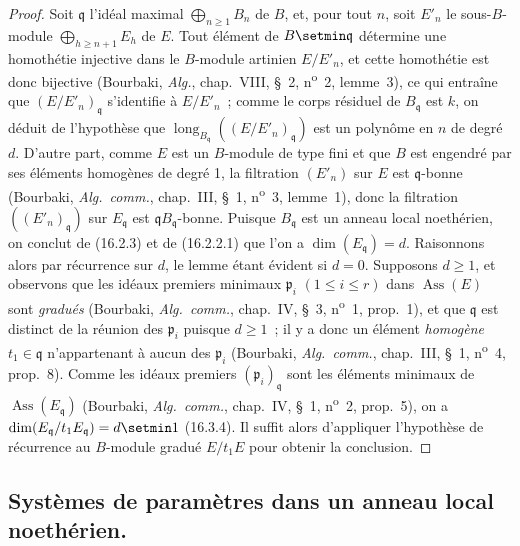 \begin{proof}
Soit $\mathfrak{q}$ l'idéal maximal $\bigoplus_{n\geq1}B_n$ de $B$, et, pour
tout $n$, soit $E'_n$ le sous-$B$-module $\bigoplus_{h\geq n+1}E_h$ de $E$.
Tout élément de $B\setmin\mathfrak{q}$ détermine une homothétie injective dans le
$B$-module artinien $E/E'_n$, et cette homothétie est donc bijective
(Bourbaki, \emph{Alg.}, chap.~VIII, \S~2, n\textsuperscript{o}~2, lemme~3), ce qui entraîne que
$(E/E'_n)_{\mathfrak{q}}$ s'identifie à $E/E'_n$~; comme le corps résiduel de
$B_{\mathfrak{q}}$ est $k$, on déduit de l'hypothèse que
$\operatorname{long}_{B_{\mathfrak{q}}}((E/E'_n)_{\mathfrak{q}})$ est un
polynôme en $n$ de degré $d$. D'autre part, comme $E$ est un $B$-module de
type fini et que $B$ est engendré par ses éléments homogènes de degré 1, la
filtration $(E'_n)$ sur $E$ est $\mathfrak{q}$-bonne (Bourbaki,
\emph{Alg.~comm.}, chap.~III, \S~1, n\textsuperscript{o}~3, lemme~1), donc la filtration
$((E'_n)_{\mathfrak{q}})$ sur $E_{\mathfrak{q}}$ est
$\mathfrak{q}B_{\mathfrak{q}}$-bonne. Puisque $B_{\mathfrak{q}}$ est un anneau
local noethérien, on conclut de (16.2.3) et de (16.2.2.1) que l'on a
$\dim(E_{\mathfrak{q}})=d$. Raisonnons alors par récurrence sur $d$, le lemme
étant évident si $d=0$. Supposons $d\geq1$, et observons que les idéaux premiers
minimaux $\mathfrak{p}_i$ $(1\leq i\leq r)$ dans
$\operatorname{Ass}(E)$ sont \emph{gradués} (Bourbaki, \emph{Alg.~comm.},
chap.~IV, \S~3, n\textsuperscript{o}~1, prop.~1), et que $\mathfrak{q}$ est distinct de la
réunion des $\mathfrak{p}_i$ puisque $d\geq1$~; il y a donc un élément
\emph{homogène} $t_1\in\mathfrak{q}$ n'appartenant à aucun des
$\mathfrak{p}_i$ (Bourbaki, \emph{Alg.~comm.}, chap.~III, \S~1, n\textsuperscript{o}~4,
prop.~8). Comme les idéaux premiers $(\mathfrak{p}_i)_{\mathfrak{q}}$ sont les
éléments minimaux de $\operatorname{Ass}(E_{\mathfrak{q}})$ (Bourbaki,
\emph{Alg.~comm.}, chap.~IV, \S~1, n\textsuperscript{o}~2, prop.~5), on a
$\dim(E_{\mathfrak{q}}/t_1E_{\mathfrak{q}})=d\setmin 1$ (16.3.4). Il suffit alors
d'appliquer l'hypothèse de récurrence au $B$-module gradué $E/t_1E$ pour
obtenir la conclusion.
\end{proof}

\subsection{Systèmes de paramètres dans un anneau local noethérien.}
\label{subsection:0.16.3-fr}

